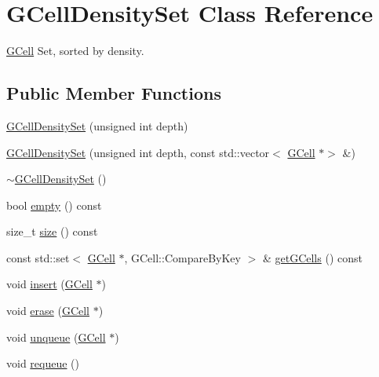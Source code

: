\hypertarget{classKatabatic_1_1GCellDensitySet}{}\section{G\+Cell\+Density\+Set Class Reference}
\label{classKatabatic_1_1GCellDensitySet}


\hyperlink{classKatabatic_1_1GCell}{G\+Cell} Set, sorted by density.  


\subsection*{Public Member Functions}
\begin{DoxyCompactItemize}
\item 
\hyperlink{classKatabatic_1_1GCellDensitySet_ad74cbb404ad28f734f5759462aa9f363}{G\+Cell\+Density\+Set} (unsigned int depth)
\item 
\hyperlink{classKatabatic_1_1GCellDensitySet_a5d97169315528fca978d5e65a3cc8130}{G\+Cell\+Density\+Set} (unsigned int depth, const std\+::vector$<$ \hyperlink{classKatabatic_1_1GCell}{G\+Cell} $\ast$$>$ \&)
\item 
\hyperlink{classKatabatic_1_1GCellDensitySet_aef015ff8dc7d34fcb907281f71bb0003}{$\sim$\+G\+Cell\+Density\+Set} ()
\item 
bool \hyperlink{classKatabatic_1_1GCellDensitySet_a644718bb2fb240de962dc3c9a1fdf0dc}{empty} () const
\item 
size\+\_\+t \hyperlink{classKatabatic_1_1GCellDensitySet_a259cb5a711406a8c3e5d937eb9350cca}{size} () const
\item 
const std\+::set$<$ \hyperlink{classKatabatic_1_1GCell}{G\+Cell} $\ast$, G\+Cell\+::\+Compare\+By\+Key $>$ \& \hyperlink{classKatabatic_1_1GCellDensitySet_a8bac89a45c1449ebdb28a778993cb8e5}{get\+G\+Cells} () const
\item 
void \hyperlink{classKatabatic_1_1GCellDensitySet_a6b97afb6d814ba80a24a49b3ad8e540b}{insert} (\hyperlink{classKatabatic_1_1GCell}{G\+Cell} $\ast$)
\item 
void \hyperlink{classKatabatic_1_1GCellDensitySet_a743f7f98fe31b8a1c134aff01ba03acb}{erase} (\hyperlink{classKatabatic_1_1GCell}{G\+Cell} $\ast$)
\item 
void \hyperlink{classKatabatic_1_1GCellDensitySet_a89099ec88eadcadb942b7d64a6ffd7ee}{unqueue} (\hyperlink{classKatabatic_1_1GCell}{G\+Cell} $\ast$)
\item 
void \hyperlink{classKatabatic_1_1GCellDensitySet_ac84efe46d8a3c409e85bc3420240c3c2}{requeue} ()
\end{DoxyCompactItemize}


